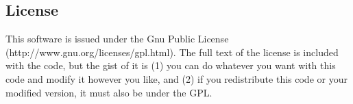 \documentclass[10pt]{article}
\begin{document}
\subsection*{License}
This software is issued under the Gnu Public License (http://www.gnu.org/licenses/gpl.html).  The full text of the license is included with the code, but the gist of it is (1) you can do whatever you want with this code and modify it however you like, and (2) if you redistribute this code or your modified version, it must also be under the GPL.
\end{document}
